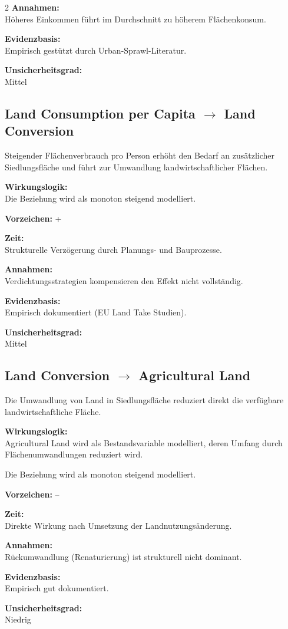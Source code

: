 \documentclass[10pt, a4paper]{article}
\begin{document}
\begin{multicols}{2}
\textbf{Annahmen:}\\
Höheres Einkommen führt im Durchschnitt zu höherem Flächenkonsum.

\textbf{Evidenzbasis:}\\
Empirisch gestützt durch Urban-Sprawl-Literatur.

\textbf{Unsicherheitsgrad:}\\
Mittel

\vfill\columnbreak %

\subsection*{Land Consumption per Capita $\rightarrow$ Land Conversion}
Steigender Flächenverbrauch pro Person erhöht den Bedarf an zusätzlicher Siedlungsfläche und führt zur Umwandlung landwirtschaftlicher Flächen.

\textbf{Wirkungslogik:}\\
Die Beziehung wird als monoton steigend modelliert.

\textbf{Vorzeichen:} +

\textbf{Zeit:}\\
Strukturelle Verzögerung durch Planungs- und Bauprozesse.

\textbf{Annahmen:}\\
Verdichtungsstrategien kompensieren den Effekt nicht vollständig.

\textbf{Evidenzbasis:}\\
Empirisch dokumentiert (EU Land Take Studien).

\textbf{Unsicherheitsgrad:}\\
Mittel

\vspace{0.5cm}

\subsection*{Land Conversion $\rightarrow$ Agricultural Land}
Die Umwandlung von Land in Siedlungsfläche reduziert direkt die verfügbare landwirtschaftliche Fläche. 

\textbf{Wirkungslogik:}\\
Agricultural Land wird als Bestandsvariable modelliert, deren Umfang durch Flächenumwandlungen reduziert wird.

Die Beziehung wird als monoton steigend modelliert.

\textbf{Vorzeichen:} --

\textbf{Zeit:}\\
Direkte Wirkung nach Umsetzung der Landnutzungsänderung.

\textbf{Annahmen:}\\
Rückumwandlung (Renaturierung) ist strukturell nicht dominant.

\textbf{Evidenzbasis:}\\
Empirisch gut dokumentiert.

\textbf{Unsicherheitsgrad:}\\
Niedrig

\end{multicols}
\newpage
\end{document}

